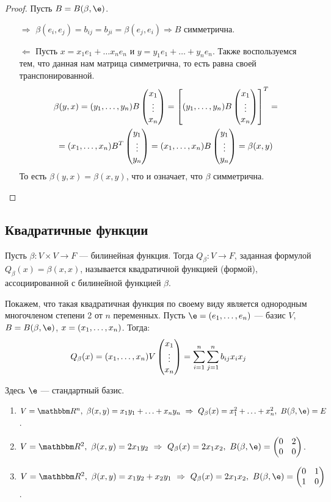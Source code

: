 \begin{proof}
Пусть $B = B(\beta, \e)$.
\begin{itemize}
\item[$\Rightarrow$] $\beta(e_i, e_j) = b_{ij} = b_{ji} = \beta(e_j, e_i) \Rightarrow B$ симметрична. 
\item[$\Leftarrow$] Пусть $x = x_1e_1 + \ldots x_ne_n$ и $y = y_1e_1 + \ldots + y_ne_n$. Также воспользуемся тем, что данная нам матрица симметрична, то есть равна своей транспонированной.
\begin{gather*}
\beta(y, x) = ({y}_1, \ldots, {y}_n)B\begin{pmatrix}{x}_1 \\\vdots\\{x}_n\end{pmatrix} = \left[({y}_1, \ldots, {y}_n)B\begin{pmatrix}{x}_1 \\\vdots\\{x}_n\end{pmatrix}\right]^T =\\
= ({x}_1, \ldots, {x}_n)B^T\begin{pmatrix}{y}_1 \\\vdots\\{y}_n\end{pmatrix} = ({x}_1, \ldots, {x}_n)B\begin{pmatrix}{y}_1 \\\vdots\\{y}_n\end{pmatrix} = \beta(x, y)
\end{gather*}
То есть $\beta(y, x) = \beta(x, y)$, что и означает, что $\beta$ симметрична.
\end{itemize}
\end{proof}

\subsection*{Квадратичные функции}

\begin{Def}
Пусть $\beta \colon V\times V \rightarrow F$ --- билинейная функция. Тогда $Q_\beta \colon V \rightarrow F$, заданная формулой $Q_\beta(x) = \beta(x, x)$, называется квадратичной функцией (формой), ассоциированной с билинейной функцией $\beta$.
\end{Def}

Покажем, что такая квадратичная функция по своему виду является однородным многочленом степени 2 от $n$ переменных. Пусть $\e = \vector{e}$ --- базис $V$, $B = B(\beta, \e)$, $x = ({x}_1, \ldots, {x}_n)$. Тогда:
$$
Q_\beta(x) = ({x}_1, \ldots, {x}_n)V\begin{pmatrix}{x}_1 \\\vdots\\{x}_n\end{pmatrix} = \sum_{i = 1}^{n}\sum_{j = 1}^{n}b_{ij}x_ix_j
$$

\begin{Examples}
Здесь $\e$ --- стандартный базис.
\begin{enumerate}
\item $V = \R^n,\ \beta(x, y) = x_1y_1 + \ldots + x_ny_n\ \Rightarrow\ Q_\beta(x) = x_1^2 + \ldots + x_n^2,\ B(\beta, \e) = E$.
\item $V = \R^2,\ \beta(x, y) = 2x_1y_2\ \Rightarrow\ Q_\beta(x) = 2x_1x_2,\ B(\beta, \e) = \begin{pmatrix}0 & 2 \\ 0 & 0\end{pmatrix}$.
\item $V=\R^2,\ \beta(x, y) = x_1y_2+x_2y_1\ \Rightarrow\ Q_\beta(x) = 2x_1x_2,\ B(\beta, \e) = \begin{pmatrix}0 & 1 \\ 1 & 0\end{pmatrix}$.
\end{enumerate}
\end{Examples}

